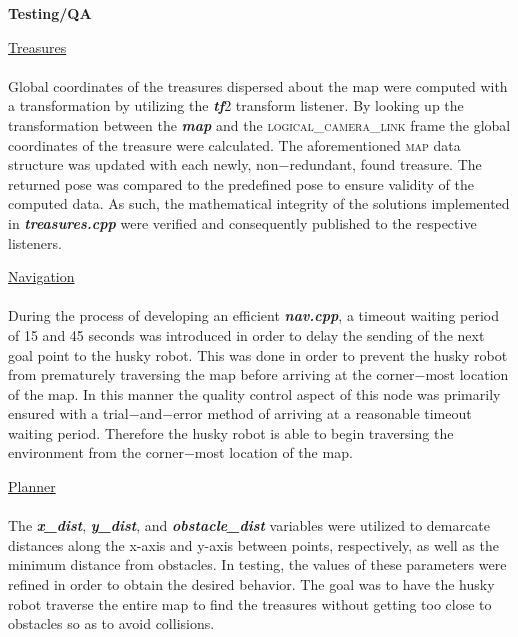 \documentclass[12pt]{article}
\begin{document}
{\setlength{\parindent}{0cm}
\textbf{Testing/QA}\\
\begin{center}\underline{Treasures}\end{center}
\paragraph{}Global coordinates of the treasures dispersed about the map were computed with a transformation by utilizing the \textbf{\textit{tf}}2 transform listener. By looking up the transformation between the \textbf{\textit{map}} and the \textsc{logical\_camera\_link} frame the global coordinates of the treasure were calculated. 
  The aforementioned \textsc{map} data structure was updated with each newly, non$-$redundant, found treasure. The returned pose was compared to the predefined pose to ensure validity of the computed data. As such, the mathematical integrity of the solutions implemented in \textbf{\textit{treasures.cpp}} were verified and consequently published to the respective listeners. 
\begin{center}\underline{Navigation}\end{center}
\paragraph{}During the process of developing an efficient \textit{\textbf{nav.cpp}}, a timeout waiting period of 15 and 45 seconds was introduced in order to delay the sending of the next goal point to the husky robot. This was done in order to prevent the husky robot from prematurely traversing the map before arriving at the corner$-$most location of the map.
  In this manner the quality control aspect of this node was primarily ensured with a trial$-$and$-$error method of arriving at a reasonable timeout waiting period. Therefore the husky robot is able to begin traversing the environment from the corner$-$most location of the map.  
\begin{center}\underline{Planner}\end{center}
\paragraph{}The \textbf{\textit{x\_dist}}, \textbf{\textit{y\_dist}}, and \textbf{\textit{obstacle\_dist}} variables were utilized to demarcate distances along the x-axis and y-axis between points, respectively, as well as the minimum distance from obstacles. In testing, the values of these parameters were refined in order to obtain the desired behavior. The goal was to have the husky robot traverse the entire map to find the treasures without getting too close to obstacles so as to avoid  collisions.
\\\\\\ 
}
\end{document}
